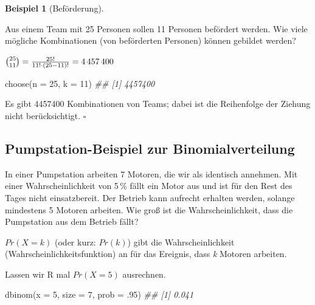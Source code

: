 \documentclass[
  ngerman,
  letterpaper,
  twoside,
  open=any]{scrbook}
\newenvironment{Shaded}{\begin{snugshade}}{\end{snugshade}}
\newcommand{\AttributeTok}[1]{\textcolor[rgb]{0.40,0.45,0.13}{#1}}
\newcommand{\DecValTok}[1]{\textcolor[rgb]{0.68,0.00,0.00}{#1}}
\newcommand{\DocumentationTok}[1]{\textcolor[rgb]{0.37,0.37,0.37}{\textit{#1}}}
\newcommand{\FunctionTok}[1]{\textcolor[rgb]{0.28,0.35,0.67}{#1}}
\newcommand{\NormalTok}[1]{\textcolor[rgb]{0.00,0.23,0.31}{#1}}
\theoremstyle{definition}
\newtheorem{example}{Beispiel}[chapter]
\theoremstyle{plain}
\theoremstyle{definition}
\theoremstyle{definition}
\theoremstyle{definition}
\newtheorem{example}{Beispiel}[chapter]
\theoremstyle{definition}
\theoremstyle{remark}
\begin{document}
\begin{example}[Beförderung]\protect\hypertarget{exm-befördern}{}\label{exm-befördern}

Aus einem Team mit 25 Personen sollen 11 Personen befördert werden. Wie
viele mögliche Kombinationen (von beförderten Personen) können gebildet
werden?

\(\tbinom{25}{11} = \frac{25!}{11!\cdot(25-11)!} = 4\,457\,400\)

\begin{Shaded}
\begin{Highlighting}[]
\FunctionTok{choose}\NormalTok{(}\AttributeTok{n =} \DecValTok{25}\NormalTok{, }\AttributeTok{k =} \DecValTok{11}\NormalTok{)}
\DocumentationTok{\#\# [1] 4457400}
\end{Highlighting}
\end{Shaded}

Es gibt 4457400 Kombinationen von Teams; dabei ist die Reihenfolge der
Ziehung nicht berücksichtigt. \(\square\)

\end{example}

\subsection{Pumpstation-Beispiel zur
Binomialverteilung}\label{pumpstation-beispiel-zur-binomialverteilung}

In einer Pumpstation arbeiten 7 Motoren, die wir als identisch annehmen.
Mit einer Wahrscheinlichkeit von 5\,\% fällt ein Motor aus und ist für
den Rest des Tages nicht einsatzbereit. Der Betrieb kann aufrecht
erhalten werden, solange mindestens 5 Motoren arbeiten. Wie groß ist die
Wahrscheinlichkeit, dass die Pumpstation aus dem Betrieb fällt?

\(Pr(X=k)\) (oder kurz: \(Pr(k)\)) gibt die Wahrscheinlichkeit
(Wahrscheinlichkeitsfunktion) an für das Ereignis, dass \emph{k} Motoren
arbeiten.

Lassen wir R mal \(Pr(X=5)\) ausrechnen.

\begin{Shaded}
\begin{Highlighting}[]
\FunctionTok{dbinom}\NormalTok{(}\AttributeTok{x =} \DecValTok{5}\NormalTok{, }\AttributeTok{size =} \DecValTok{7}\NormalTok{, }\AttributeTok{prob =}\NormalTok{ .}\DecValTok{95}\NormalTok{)}
\DocumentationTok{\#\# [1] 0.041}
\end{Highlighting}
\end{Shaded}
\end{document}
